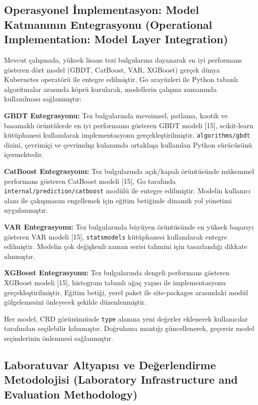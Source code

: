 \documentclass[12pt,a4paper]{article}
\begin{document}
\subsection{Operasyonel İmplementasyon: Model Katmanının Entegrasyonu (Operational Implementation: Model Layer Integration)}

Mevcut çalışmada, yüksek lisans tezi bulgularına dayanarak en iyi performans gösteren dört model (GBDT, CatBoost, VAR, XGBoost) gerçek dünya Kubernetes operatörü ile entegre edilmiştir. Go arayüzleri ile Python tabanlı algoritmalar arasında köprü kurularak, modellerin çalışma zamanında kullanılması sağlanmıştır:

\textbf{GBDT Entegrasyonu:} Tez bulgularında mevsimsel, patlama, kaotik ve basamaklı örüntülerde en iyi performansı gösteren GBDT modeli [15], scikit-learn kütüphanesi kullanılarak implementasyonu gerçekleştirilmiştir. \texttt{algorithms/gbdt} dizini, çevrimiçi ve çevrimdışı kulanımda ortaklaşa kullanılan Python sürücüsünü içermektedir.

\textbf{CatBoost Entegrasyonu:} Tez bulgularında açık/kapalı örüntüsünde mükemmel performans gösteren CatBoost modeli [15], Go tarafında \texttt{internal/prediction/catboost} modülü ile entegre edilmiştir. Modelin kullanıcı alanı ile çakışmasını engellemek için eğitim betiğinde dinamik yol yönetimi uygulanmıştır.

\textbf{VAR Entegrasyonu:} Tez bulgularında büyüyen örüntüsünde en yüksek başarıyı gösteren VAR modeli [15], \texttt{statsmodels} kütüphanesi kullanılarak entegre edilmiştir. Modelin çok değişkenli zaman serisi tahmini için tasarlandığı dikkate alınmıştır.

\textbf{XGBoost Entegrasyonu:} Tez bulgularında dengeli performans gösteren XGBoost modeli [15], histogram tabanlı ağaç yapısı ile implementasyonu gerçekleştirilmiştir. Eğitim betiği, yerel paket ile site-packages arasındaki modül gölgelemesini önleyecek şekilde düzenlenmiştir.

Her model, CRD görünümünde \texttt{type} alanına yeni değerler eklenerek kullanıcılar tarafından seçilebilir kılınmıştır. Doğrulama mantığı güncellenerek, geçersiz model seçimlerinin önlenmesi sağlanmıştır.

\subsection{Laboratuvar Altyapısı ve Değerlendirme Metodolojisi (Laboratory Infrastructure and Evaluation Methodology)}
\end{document}
